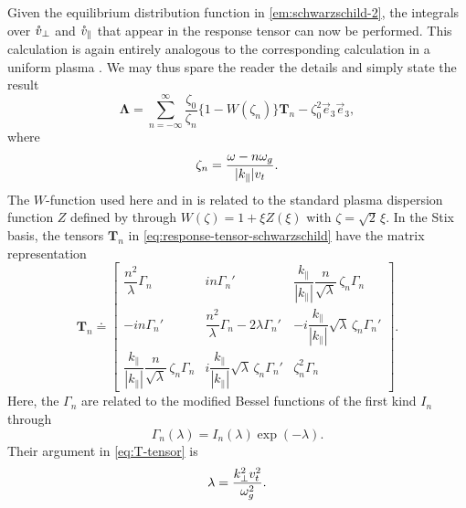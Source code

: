 \documentclass[aps,pre,notitlepage,amsmath,amssymb,amsfonts,nobibnotes,nofootinbib,superscriptaddress]{revtex4-1}
\begin{document}
Given the equilibrium distribution function in \cref{em:schwarzschild-2}, the
integrals over $\mathring{v}_\perp$ and $\mathring{v}_\parallel$ that appear in the response
tensor  can now be performed. This
calculation is again entirely analogous to the corresponding calculation in a
uniform plasma \citep[see e.g.][]{Ichimaru1973}. We may thus spare the reader
the details and simply state the result
\begin{equation}
  \label{eq:response-tensor-schwarzschild}
  \mathbf{\Lambda} =
  \sum_{n=-\infty}^\infty\frac{\zeta_0}{\zeta_n}
  \{1 - W(\zeta_n)\}\mathbf{T}_n - \zeta_0^2\vec{e}_3\vec{e}_3,
\end{equation}
where
\begin{equation}
  \label{eq:zeta-def}
  \zeta_n = \frac{\omega - n\omg}{|k_\parallel|\vt}.
\end{equation}
The $W$-function used here and in \citet{Ichimaru1973} is related to the
standard plasma dispersion function $Z$ defined by \citet{Fried1961} through
$W(\zeta)=1+\xi{}Z(\xi)$ with $\zeta=\sqrt{2}\,\xi$. In the Stix basis, the
tensors $\mathbf{T}_n$ in \cref{eq:response-tensor-schwarzschild} have the
matrix representation
\begingroup
\renewcommand*{\arraystretch}{2}
\begin{equation}
  \label{eq:T-tensor}
  \mathbf{T}_n \doteq \left[\begin{matrix}
      \dfrac{n^2}{\lambda}\Gamma_n &
      in\Gamma_n' &
      \dfrac{k_\parallel}{|k_\parallel|}
      \dfrac{n}{\sqrt{\lambda}}\,\zeta_n\Gamma_n \\
      -in\Gamma_n' &
      \dfrac{n^2}{\lambda}\Gamma_n - 2\lambda\Gamma_n' &
      -i\dfrac{k_\parallel}{|k_\parallel|}
      \sqrt{\lambda}\,\zeta_n\Gamma_n' \\
      \dfrac{k_\parallel}{|k_\parallel|}
      \dfrac{n}{\sqrt{\lambda}}\,\zeta_n\Gamma_n &
      i\dfrac{k_\parallel}{|k_\parallel|}
      \sqrt{\lambda}\,\zeta_n\Gamma_n' &
      \zeta_n^2\Gamma_n
  \end{matrix}\right].
\end{equation}
\endgroup
Here, the $\Gamma_n$ are related to the modified Bessel functions of the first
kind $I_n$ through
\begin{equation}
  \label{eq:Gamma-n}
  \Gamma_n(\lambda) = I_n(\lambda)\exp(-\lambda).
\end{equation}
Their argument in \cref{eq:T-tensor} is
\begin{equation}
  \label{eq:chi-def}
  \lambda = \frac{k_\perp^2\vt^2}{\omg^2}.
\end{equation}
\end{document}
